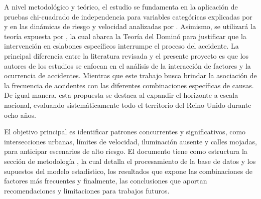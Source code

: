 \documentclass[12pt]{article}
\begin{document}
A nivel metodológico y teórico, el estudio se fundamenta en la aplicación de pruebas chi-cuadrado de independencia para variables categóricas explicadas por \textcite{McHugh2013} y en las dinámicas de riesgo y velocidad analizadas por \textcite{TAYLOR2000} . Asimismo, se utilizará la teoría expuesta por \textcite{SAXENA2017}, la cual abarca la Teoría del Dominó para justificar que la intervención en eslabones específicos interrumpe el proceso del accidente. La principal diferencia entre la literatura revisada y el presente proyecto es que los autores de los estudios se enfocan en el análisis de la interacción de factores y la ocurrencia de accidentes. Mientras que este trabajo busca brindar la asociación de la frecuencia de accidentes con las diferentes combinaciones específicas de causas. De igual manera, esta propuesta se destaca al expandir el horizonte a escala nacional, evaluando sistemáticamente todo el territorio del Reino Unido durante ocho años.

El objetivo principal es identificar patrones concurrentes y significativos, como intersecciones urbanas, límites de velocidad, iluminación ausente y calles mojadas, para anticipar escenarios de alto riesgo. El documento tiene como estructura la sección de metodología , la cual detalla el procesamiento de la base de datos y los supuestos del modelo estadístico, los resultados que expone las combinaciones de factores más frecuentes y finalmente, las conclusiones que aportan recomendaciones y limitaciones para trabajos futuros.
\end{document}
